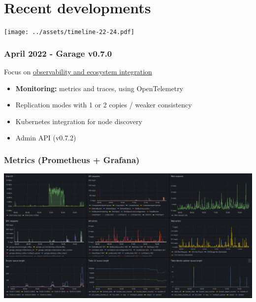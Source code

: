 \documentclass[aspectratio=169,xcolor={svgnames}]{beamer}
\begin{document}

\section{Recent developments}


\begin{frame}
	\begin{center}
		\texttt{[image: ../assets/timeline-22-24.pdf]}
	\end{center}
\end{frame}

\begin{frame}
	\frametitle{April 2022 - Garage v0.7.0}
	Focus on \underline{observability and ecosystem integration}
	\vspace{2em}
	\begin{itemize}
		\item \textbf{Monitoring:} metrics and traces, using OpenTelemetry
			\vspace{1em}
		\item Replication modes with 1 or 2 copies / weaker consistency
			\vspace{1em}
		\item Kubernetes integration for node discovery
			\vspace{1em}
		\item Admin API (v0.7.2)
	\end{itemize}
\end{frame}

\begin{frame}
	\frametitle{Metrics (Prometheus + Grafana)}
	\begin{center}
		\includegraphics[width=.9\linewidth]{../assets/screenshots/grafana_dashboard.png}
	\end{center}
\end{frame}
\end{document}
